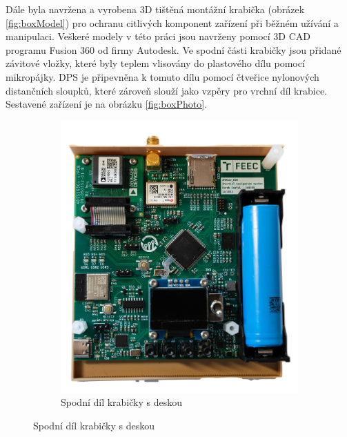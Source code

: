 Dále byla navržena a vyrobena 3D tištěná montážní krabička (obrázek \ref{fig:boxModel}) pro ochranu citlivých komponent zařízení při běžném užívání a manipulaci. Veškeré modely v této práci jsou navrženy pomocí 3D \ac{CAD} programu Fusion 360 od firmy Autodesk. Ve spodní části krabičky jsou přidané závitové vložky, které byly teplem vlisovány do plastového dílu pomocí mikropájky. \ac{DPS} je připevněna k tomuto dílu pomocí čtveřice nylonových distančních sloupků, které zároveň slouží jako vzpěry pro vrchní díl krabice. Sestavené zařízení je na obrázku \ref{fig:boxPhoto}.

\begin{figure}
     \centering
     \begin{subfigure}[b]{0.4\textwidth}
         \centering
         \includegraphics[width=\textwidth]{obrazky/imuNavPCB}
         \caption{Spodní díl krabičky s deskou}
       

\end{subfigure}
\end{figure}
